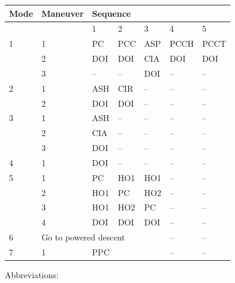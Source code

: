 \documentclass[11pt]{article} %
\begin{document}
\begin{center}
\begin{tabular}{|l|l|l|l|l|l|l|}
\hline
Mode&Maneuver&\multicolumn{5}{|l|}{Sequence}\\
\hline
&&1&2&3&4&5\\
\hline
1&1&PC&PCC&ASP&PCCH&PCCT\\
&2&DOI&DOI&CIA&DOI&DOI\\
&3&--&--&DOI&--&--\\
\hline
2&1&ASH&CIR&--&--&--\\
&2&DOI&DOI&--&--&--\\
\hline
3&1&ASH&--&--&--&--\\
&2&CIA&--&--&--&--\\
&3&DOI&--&--&--&--\\
\hline
4&1&DOI&--&--&--&--\\
\hline
5&1&PC&HO1&HO1&--&--\\
&2&HO1&PC&HO2&--&--\\
&3&HO1&HO2&PC&--&--\\
&4&DOI&DOI&DOI&--&--\\
\hline
6&\multicolumn{4}{|l|}{Go to powered descent}&--&--\\
\hline
7&1&PPC&&&--&--\\
\hline
\end{tabular}
\end{center}

Abbreviations:\\
\end{document}
